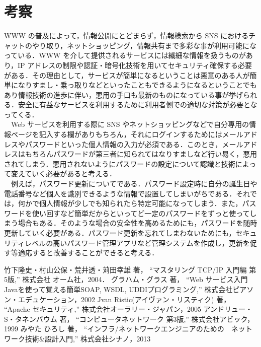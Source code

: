 \documentclass[a4j,titlepage]{jarticle}
\begin{document}
\section{考察}
WWW の普及によって，情報公開にとどまらず，情報検索から SNS におけるチャットのやり取り，ネットショッピング，情報共有まで多彩な事が利用可能になっている．WWW を介して提供されるサービスには繊細な情報を扱うものがあり，IP アドレスの制限や認証・暗号化技術を用いてセキュリティ確保する必要がある．その理由として，サービスが簡単になるということは悪意のある人が簡単になりすまし・乗っ取りなどといったこともできるようになるということでもあり情報技術の進歩に伴い，悪用の手口も最新のものになっている事が挙げられる．安全に有益なサービスを利用するために利用者側での適切な対策が必要となってくる．\\
　Web サービスを利用する際に SNS やネットショッピングなどで自分専用の情報ページを記入する欄がありもちろん，それにログインするためにはメールアドレスやパスワードといった個人情報の入力が必須である．このとき，メールアドレスはもちろんパスワードが第三者に知られてはなりすましなど行い易く，悪用されてしまう．悪用されないようにパスワードの設定について認識と技術によって変えていく必要があると考える．\\
　例えば，パスワード更新についてである．パスワード設定時に自分の誕生日や電話番号など個人を識別できるような情報で設置してしまいがちである．それでは，何かで個人情報が少しでも知られたら特定可能になってしまう．また，パスワードを使い回すなど簡単だからといってど一定のパスワードをずっと使ってしまう場合もある．そのような場合の安全性を高めるためにも，パスワードを随時更新していく必要がある．パスワード更新を忘れてしまわないためにも，セキュリティレベルの高いパスワード管理アプリなど管理システムを作成し，更新を促す等適応すると改善することができると考える．


\begin{thebibliography}{9}
    竹下隆史・村山公保・荒井透・苅田幸雄 著，
    ``マスタリング TCP/IP 入門編 第5版,''
    株式会社 オーム社，2004．
    グラハム・グラス 著，
    ``Web サービス入門 Javaを使って覚える簡単SOAP, WSDL, UDDIプログラミング,''
    株式会社ピアソン・エデュケーション，2002
    Jvan Ristic(アイヴァン・リスティク) 著，
    ``Apache セキュリティ,''
    株式会社オーラリー・ジャパン，2005
    アンドリュー・S・タネンバウム 著，
    ``コンピュータネットワーク 第3版,''
    株式会社アビック，1999
    みやた ひろし 著，
    ``インフラ/ネットワークエンジニアのための　ネットワーク技術&設計入門,''
    株式会社シナノ，2013 
\end{thebibliography}
\end{document}
